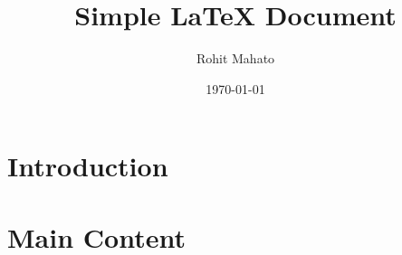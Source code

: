 \documentclass[12pt]{article}
\title{Simple LaTeX Document}
\author{Rohit Mahato}
\date{\today}
\begin{document}
\maketitle

\section{Introduction}
\lipsum[1-2] 

\section{Main Content}
\lipsum[3-4] 
\end{document}
